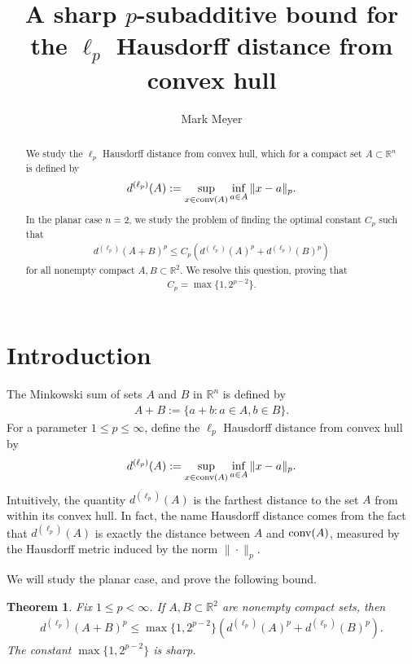 \documentclass[11pt]{article}
\title{A sharp $p$-subadditive bound for the $\ell_p$ Hausdorff distance from convex hull}
\author{Mark Meyer}
\newtheorem{theorem}{Theorem}[section]
\begin{document}
\maketitle
\begin{abstract}
    We study the $\ell_p$ Hausdorff distance from convex hull, which for a compact set $A\subset \mathbb{R}^n$ is defined by
    \begin{equation*}
        d^{(\ell_p)}(A):=\sup_{x\in \textup{conv}(A)}\inf_{a\in A}\|x-a\|_p.
    \end{equation*}
    In the planar case $n=2$, we study the problem of finding the optimal constant $C_p$ such that 
    \begin{align*}
        d^{(\ell_p)}(A+B)^p\leq C_p\left(d^{(\ell_p)}(A)^p+d^{(\ell_p)}(B)^p\right)
    \end{align*}
    for all nonempty compact $A,B\subset\mathbb{R}^2$. We resolve this question, proving that
    \begin{align*}
        C_p=\max\{1,2^{p-2}\}.
    \end{align*}
\end{abstract}

\section{Introduction}

The Minkowski sum of sets $A$ and $B$ in $\mathbb{R}^n$ is defined by
\begin{align*}
    A+B:=\{a+b:a\in A,b\in B\}.
\end{align*}
For a parameter $1\leq p\leq \infty$, define the $\ell_p$ Hausdorff distance from convex hull by
\begin{align*}
    d^{(\ell_p)}(A):=\sup_{x\in \textup{conv}(A)}\inf_{a\in A}\|x-a\|_p.
\end{align*}
Intuitively, the quantity $d^{(\ell_p)}(A)$ is the farthest distance to the set $A$ from within its convex hull. In fact, the name Hausdorff distance comes from the fact that $d^{(\ell_p)}(A)$ is exactly the distance between $A$ and $\textup{conv}(A)$, measured by the Hausdorff metric induced by the norm $\|\cdot\|_p$.

We will study the planar case, and prove the following bound.

\begin{theorem}\label{theorem:p-subadditive_bound}
    Fix $1\leq p<\infty$. If $A,B\subset\mathbb{R}^2$ are nonempty compact sets, then
    \begin{align}\label{eq:p-subadditive_bound_formula}
        d^{(\ell_p)}(A+B)^p\leq \max\{1,2^{p-2}\}\left(d^{(\ell_p)}(A)^p+d^{(\ell_p)}(B)^p\right).
    \end{align}
    The constant $\max\{1,2^{p-2}\}$ is sharp.
\end{theorem}
\end{document}
